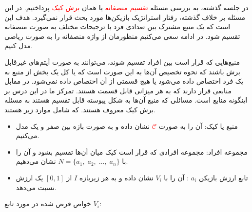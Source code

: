 \documentclass{article}
\begin{document}
\vspace{0.5cm}	

\vspace{0.5cm}

\setlength{\abovedisplayskip}{0.5pt}
\setlength{\belowdisplayskip}{0.5pt}
\newtheorem{definition}{تعریف}
\newtheorem{theorem}{قضیه}
\newtheorem{example}{مثال}

در جلسه گذشته، به بررسی 
مسئله 
\textcolor{red}{
تقسیم منصفانه
}
یا همان 
\textcolor{red}{
برش کیک
}
پرداختیم. در این مسئله بر خلاف گذشته، رفتار استراتژیک بازیکن‌ها مورد بحث قرار نمی‌گیرد.
هدف این است که یک منبع مشترک بین تعدادی فرد با ترجیحات مختلف به صورت منصفانه تقسیم شود.
در ادامه سعی می‌کنیم منظورمان از واژه منصفانه را به صورت ریاضی مدل کنیم.

منبع‌هایی که قرار است بین افراد تقسیم شوند، می‌توانند به صورت آیتم‌های غیرقابل برش
باشند که نحوه تخصیص آن‌ها به این صورت است که یا کل یک بخش از منبع به یک فرد 
اختصاص داده ‌می‌شود یا هیچ قسمتی از آن اختصاص داده نمی‌شود.
در مقابل منابعی قرار دارند که به هر میزانی قابل قسمت هستند.
تمرکز ما در این درس بر اینگونه منابع است.
مسائلی که منبع آن‌ها به شکل پیوسته قابل تقسیم هستند به مسئله برش کیک معروف هستند.
که شامل موارد زیر هستند.
\begin{itemize}
    \item منبع یا کیک: آن را به صورت  \textcolor{red}{$\mathcal{C}$} نشان داده و به صورت بازه بین صفر و یک مدل می‌کنیم.
    \item مجموعه افراد: مجموعه افرادی که قرار است کیک میان آن‌ها تقسیم بشود و آن را با
    $N =\{a_1,\; a_2,\; \ldots,\; a_n\}$ نشان می‌دهیم.
    \item 
    
    تابع ارزش بازیکن $a_i$
    :
    آن را با $V_i$ نشان داده و به هر زیربازه $I$ از $[0, 1]$ یک ارزش نسبت می‌دهد.
\end{itemize}
خواص فرض شده در مورد تابع $V_i$:
\end{document}
